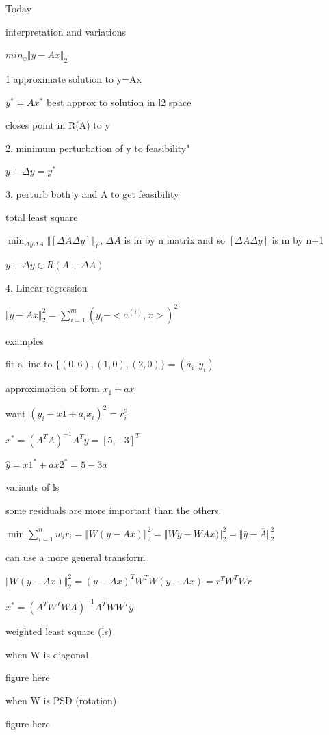 Today

interpretation and variations 


$min_x \Vert y-Ax\Vert_2$

1 approximate solution to y=Ax

$y^*=Ax^*$ best approx to solution in l2 space

closes point in R(A) to y

2. minimum perturbation of y to feasibility"

$y+\Delta y= y^*$

3. perturb both y and A to get feasibility

total least square

$\min_{\Delta y \Delta A} \Vert [\Delta A \Delta y] \Vert_F$, $\Delta A$ is m by n matrix and so $[\Delta A \Delta y]$ is m by n+1



$y+\Delta y\in R(A+\Delta A)$


4. Linear regression

$\Vert y-Ax\Vert ^2_2 = \sum_{i=1}^{m} ( y_i - <a^{(i)} , x>)^2$


examples

fit a line to $\{(0,6),(1,0),(2,0) \}={(a_i,y_i)}$

approximation of form $x_1+ax$

want $(y_i-x1+a_ix_i)^2 = r_i^2$

$x^*=(A^TA)^{-1}A^Ty=[5 , -3]^T$


$\hat{y}=x1^*+ax2^*=5-3a$            %


variants of ls

some residuals are more important than the others.

$\min \sum_{i=1}^{n} w_i r_i=\Vert W (y-Ax)\Vert ^2_2=\Vert Wy-WAx)\Vert ^2_2=\Vert \bar{y}-\bar{A} \Vert ^2_2$

can use a more general transform 

$\Vert W (y-Ax)\Vert ^2_2 = (y-Ax)^TW^TW(y-Ax)=r^TW^TWr$

$x^*=(A^TW^TWA)^{-1}A^TWW^Ty$




weighted least square (ls) 

when W is diagonal 

figure here

when W is PSD (rotation)

figure here




